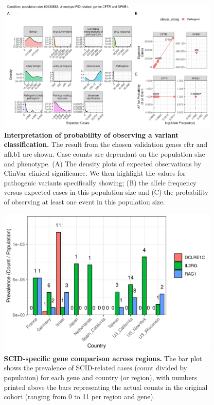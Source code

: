 \begin{figure}[ht]
  \centering
  \includegraphics[width=\textwidth]{../images/validation_studies_scatterdense_expected_prob.png}
  \caption{\textbf{Interpretation of probability of observing a variant classification.} 
 The result from the chosen validation genes \ac{cftr} and \ac{nfkb1} are shown. 
 Case counts are dependant on the population size and phenotype.
(A) The density plots of expected observations by ClinVar clinical significance. 
We then highlight the values for pathogenic variants specifically showing;
(B) the allele frequency versus expected cases in this population size and
(C) the probability of observing at least one event in this population size.}
  \label{fig:validation_scatter_dense}
\end{figure}

\begin{figure}[ht]
  \centering
  \includegraphics[width=.75\textwidth]{../images/validation_studies_scid_gene_comparison.pdf}
  \caption{\textbf{SCID-specific gene comparison across regions.} The bar plot shows the prevalence of SCID-related cases (count divided by population) for each gene and country (or region), with numbers printed above the bars representing the actual counts in the original cohort (ranging from 0 to 11 per region and gene).}
  \label{fig:scid_gene_comparison}
\end{figure}

